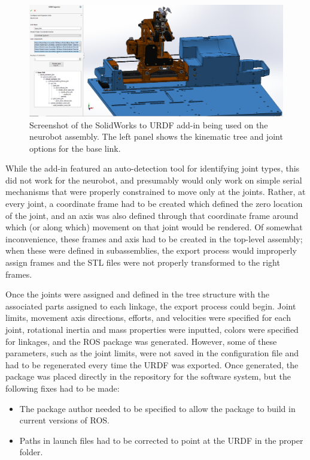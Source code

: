 \documentclass[12pt]{report}
\begin{document}
\begin{figure}[thpb]
	\centering
	\includegraphics[width=\textwidth]{images/solidworks_to_urdf_screenshot.PNG}
    \caption{Screenshot of the SolidWorks to URDF add-in being used on the neurobot assembly. The left panel shows the kinematic tree and joint options for the base link.}
    \label{fig:solidWorksExport}
\end{figure}

While the add-in featured an auto-detection tool for identifying joint types, this did not work for the neurobot, and presumably would only work on simple serial mechanisms that were properly constrained to move only at the joints. Rather, at every joint, a coordinate frame had to be created which defined the zero location of the joint, and an axis was also defined through that coordinate frame around which (or along which) movement on that joint would be rendered. Of somewhat inconvenience, these frames and axis had to be created in the top-level assembly; when these were defined in subassemblies, the export process would improperly assign frames and the STL files were not properly transformed to the right frames.

Once the joints were assigned and defined in the tree structure with the associated parts assigned to each linkage, the export process could begin. Joint limits, movement axis directions, efforts, and velocities were specified for each joint, rotational inertia and mass properties were inputted, colors were specified for linkages, and the ROS package was generated. However, some of these parameters, such as the joint limits, were not saved in the configuration file and had to be regenerated every time the URDF was exported. Once generated, the package was placed directly in the repository for the software system, but the following fixes had to be made:
\begin{itemize}
\item The package author needed to be specified to allow the package to build in current versions of ROS.
\item Paths in launch files had to be corrected to point at the URDF in the proper folder.
\end{itemize}
\end{document}
